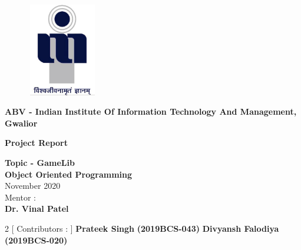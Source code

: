 \documentclass[12pt]{article}
\begin{document}
	\thispagestyle{empty}
	\begin{titlepage}
		\begin{figure}[h]
			\centerline{\includegraphics[width=1.2in,height=1.6in]{iiitm}}
		\end{figure}
		\vspace{0.1in}
		\begin{center}
			{\Large \bf ABV - Indian Institute Of Information Technology And Management, Gwalior\\}
		\end{center}
		\begin{center}
			\vspace{1.0in}
			\textbf{\huge  Project Report} \\
		\end{center}
		\begin{center}
			{\Large \bf Topic - GameLib}\\
			\vspace{0.2in}
			{\Large \bf Object Oriented Programming} \\
			November 2020\\
			\vspace{0.5in}
			{\Large Mentor :}\\
			{\Large \bf Dr. Vinal Patel}
			\vspace{0.5in}
			\begin{multicols}{2}
				[
				{\Large Contributors :}
				]
				{\Large \bf Prateek Singh}\hspace{1in}
				{\bf (2019BCS-043)}\hspace{1in}
				{\Large \bf Divyansh Falodiya}\hspace{1in}
				{\bf (2019BCS-020)}
			\end{multicols}
			\vspace{0.4in}
			\vspace{0.3in}
			\end {center}
			\vspace{0.2in}
			

\end{titlepage}
\end{document}
